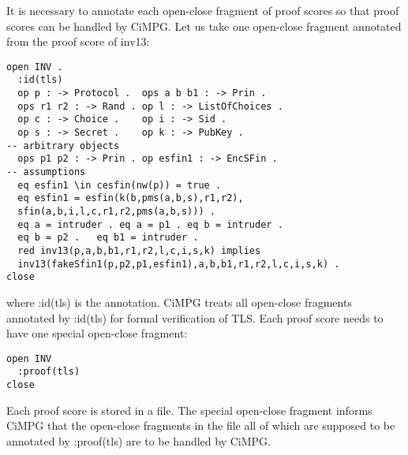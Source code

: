 \documentclass[a4paper,fleqn]{cas-dc}
\begin{document}
It is necessary to annotate each open-close fragment of proof
scores so that proof scores can be handled by CiMPG. Let us take
one open-close fragment annotated from the proof score of inv13:
\begin{small}
\begin{verbatim}
open INV .
  :id(tls)
  op p : -> Protocol .  ops a b b1 : -> Prin .
  ops r1 r2 : -> Rand . op l : -> ListOfChoices .
  op c : -> Choice .    op i : -> Sid .
  op s : -> Secret .    op k : -> PubKey .
-- arbitrary objects
  ops p1 p2 : -> Prin . op esfin1 : -> EncSFin .
-- assumptions
  eq esfin1 \in cesfin(nw(p)) = true .
  eq esfin1 = esfin(k(b,pms(a,b,s),r1,r2),
  sfin(a,b,i,l,c,r1,r2,pms(a,b,s))) .
  eq a = intruder . eq a = p1 . eq b = intruder .
  eq b = p2 .   eq b1 = intruder . 
  red inv13(p,a,b,b1,r1,r2,l,c,i,s,k) implies
  inv13(fakeSfin1(p,p2,p1,esfin1),a,b,b1,r1,r2,l,c,i,s,k) .
close
\end{verbatim}
\end{small}
where :id(tls) is the annotation. CiMPG treats all open-close fragments annotated by :id(tls) for formal verification of TLS. Each proof score needs to have one special open-close fragment:
\begin{small}
\begin{verbatim}
open INV
  :proof(tls)
close
\end{verbatim}
\end{small}
Each proof score is stored in a file. The special open-close
fragment informs CiMPG that the open-close fragments in the file
all of which are supposed to be annotated by :proof(tls) are to
be handled by CiMPG.
\end{document}
